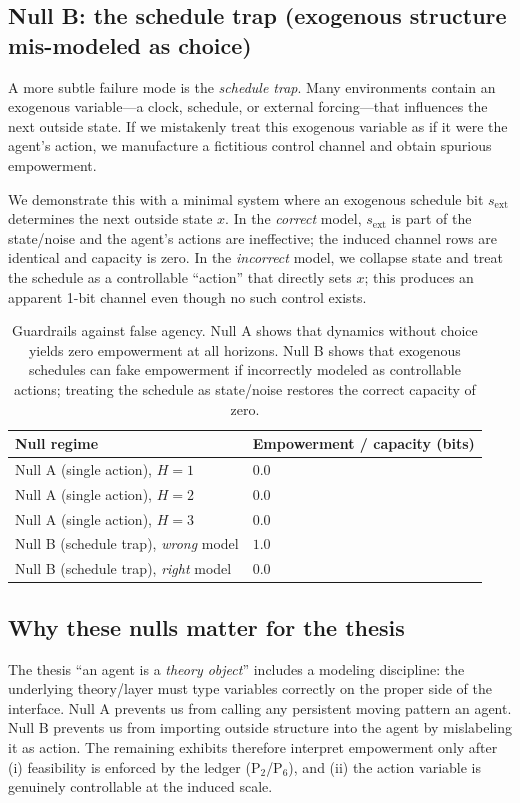 \documentclass[11pt]{article}
\begin{document}
\subsection{Null B: the schedule trap (exogenous structure mis-modeled as choice)}
A more subtle failure mode is the \emph{schedule trap}. Many environments contain an exogenous variable---a clock, schedule, or external forcing---that influences the next outside state. If we mistakenly treat this exogenous variable as if it were the agent's action, we manufacture a fictitious control channel and obtain spurious empowerment.

We demonstrate this with a minimal system where an exogenous schedule bit $s_{\mathrm{ext}}$ determines the next outside state $x$. In the \emph{correct} model, $s_{\mathrm{ext}}$ is part of the state/noise and the agent's actions are ineffective; the induced channel rows are identical and capacity is zero. In the \emph{incorrect} model, we collapse state and treat the schedule as a controllable ``action'' that directly sets $x$; this produces an apparent 1-bit channel even though no such control exists.

\begin{table}[t]
\centering
\small
\begin{tabular}{@{}l l@{}}
\toprule
\textbf{Null regime} & \textbf{Empowerment / capacity (bits)} \\
\midrule
Null A (single action), $H=1$ & $0.0$ \\
Null A (single action), $H=2$ & $0.0$ \\
Null A (single action), $H=3$ & $0.0$ \\
\addlinespace
Null B (schedule trap), \emph{wrong} model & $1.0$ \\
Null B (schedule trap), \emph{right} model & $0.0$ \\
\bottomrule
\end{tabular}
\caption{Guardrails against false agency. Null A shows that dynamics without choice yields zero empowerment at all horizons. Null B shows that exogenous schedules can fake empowerment if incorrectly modeled as controllable actions; treating the schedule as state/noise restores the correct capacity of zero.}
\label{tab:nulls}
\end{table}

\subsection{Why these nulls matter for the thesis}
The thesis ``an agent is a \emph{theory object}'' includes a modeling discipline: the underlying theory/layer must type variables correctly on the proper side of the interface. Null A prevents us from calling any persistent moving pattern an agent. Null B prevents us from importing outside structure into the agent by mislabeling it as action. The remaining exhibits therefore interpret empowerment only after (i) feasibility is enforced by the ledger (P$_2$/P$_6$), and (ii) the action variable is genuinely controllable at the induced scale.
\end{document}
